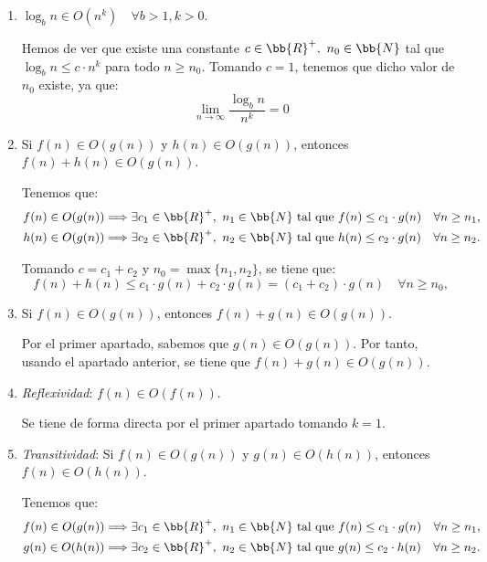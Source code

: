 \begin{ejercicio}
\begin{enumerate}[label=\alph*)]
        \item $\log_b n \in O(n^k) \quad \forall b>1,k>0$.
        
        Hemos de ver que existe una constante $c\in \bb{R}^+,~n_0\in \bb{N}$ tal que $\log_b n \leq c\cdot n^k$ para todo $n\geq n_0$.
        Tomando $c=1$, tenemos que dicho valor de $n_0$ existe, ya que:
        \begin{equation*}
            \lim_{n\to\infty} \frac{\log_b n}{n^k} = 0
        \end{equation*}

        \item Si $f(n)\in O(g(n))$ y $h(n)\in O(g(n))$, entonces $f(n)+h(n)\in O(g(n))$.
        
        Tenemos que:
        \begin{align*}
            f(n)\in O(g(n)) &\Longrightarrow \exists c_1\in \bb{R}^+,~n_1\in \bb{N} \text{ tal que } f(n)\leq c_1\cdot g(n) \quad \forall n\geq n_1, \\
            h(n)\in O(g(n)) &\Longrightarrow \exists c_2\in \bb{R}^+,~n_2\in \bb{N} \text{ tal que } h(n)\leq c_2\cdot g(n) \quad \forall n\geq n_2.
        \end{align*}

        Tomando $c=c_1+c_2$ y $n_0=\max\{n_1,n_2\}$, se tiene que:
        \begin{equation*}
            f(n)+h(n)\leq c_1\cdot g(n) + c_2\cdot g(n) = (c_1+c_2)\cdot g(n) \quad \forall n\geq n_0,
        \end{equation*}
        
        \item Si $f(n)\in O(g(n))$, entonces $f(n)+g(n)\in O(g(n))$.
        
        Por el primer apartado, sabemos que $g(n)\in O(g(n))$.
        Por tanto, usando el apartado anterior, se tiene que $f(n)+g(n)\in O(g(n))$.

        \item \emph{Reflexividad}: $f(n)\in O(f(n))$.
        
        Se tiene de forma directa por el primer apartado tomando $k=1$.

        \item \emph{Transitividad}: Si $f(n)\in O(g(n))$ y $g(n)\in O(h(n))$, entonces $f(n)\in O(h(n))$.
        
        Tenemos que:
        \begin{align*}
            f(n)\in O(g(n)) &\Longrightarrow \exists c_1\in \bb{R}^+,~n_1\in \bb{N} \text{ tal que } f(n)\leq c_1\cdot g(n) \quad \forall n\geq n_1, \\
            g(n)\in O(h(n)) &\Longrightarrow \exists c_2\in \bb{R}^+,~n_2\in \bb{N} \text{ tal que } g(n)\leq c_2\cdot h(n) \quad \forall n\geq n_2.
        \end{align*}


\end{enumerate}
\end{ejercicio}
